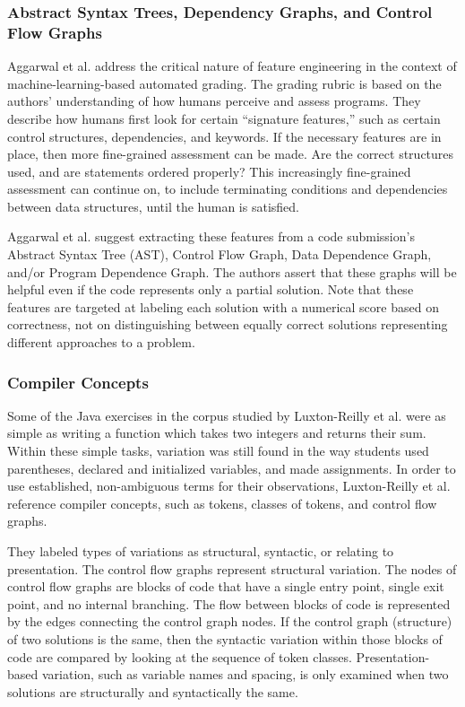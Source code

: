 \subsubsection{Abstract Syntax Trees, Dependency Graphs, and Control Flow Graphs}

Aggarwal et al. \cite{aggarwalprinciples} address the critical nature of feature engineering in the context of machine-learning-based automated grading. The grading rubric is based on the authors' understanding of how humans perceive and assess programs. They describe how humans first look for certain ``signature features,'' such as certain control structures, dependencies, and keywords. If the necessary features are in place, then more fine-grained assessment can be made. Are the correct structures used, and are statements ordered properly? This increasingly fine-grained assessment can continue on, to include terminating conditions and dependencies between data structures, until the human is satisfied. 

Aggarwal et al. suggest extracting these features from a code submission's Abstract Syntax Tree (AST), Control Flow Graph, Data Dependence Graph, and/or Program Dependence Graph. The authors assert that these graphs will be helpful even if the code represents only a partial solution. Note that these features are targeted at labeling each solution with a numerical score based on correctness, not on distinguishing between equally correct solutions representing different approaches to a problem.



\subsubsection{Compiler Concepts}

Some of the Java exercises in the corpus studied by Luxton-Reilly et al. \cite{Luxton13} were as simple as writing a function which takes two integers and returns their sum. Within these simple tasks, variation was still found in the way students used parentheses, declared and initialized variables, and made assignments. In order to use established, non-ambiguous terms for their observations, Luxton-Reilly et al. reference compiler concepts, such as tokens, classes of tokens, and control flow graphs. 

They labeled types of variations as structural, syntactic, or relating to presentation. The control flow graphs represent structural variation. The nodes of control flow graphs are blocks of code that have a single entry point, single exit point, and no internal branching. The flow between blocks of code is represented by the edges connecting the control graph nodes. If the control graph (structure) of two solutions is the same, then the syntactic variation within those blocks of code are compared by looking at the sequence of token classes. Presentation-based variation, such as variable names and spacing, is only examined when two solutions are structurally and syntactically the same.

